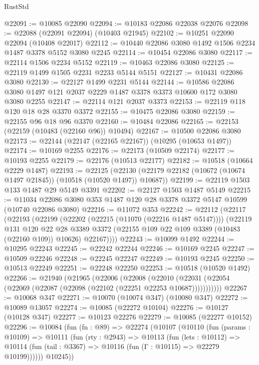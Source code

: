 \begin{lexlean}{RustStd}
\begin{coremodule}
@22091 := @10085 @22090
@22094 := @10183 @22086 @22038 @22076
@22098 := @22088 (@22091 @22094) (@10403 @21945)
@22102 := @10251 @22090 @22094 (@10408 @22017)
@22112 := @10440 @22086 @3080 @1492 @1506 @2234 @1487 @3378 @5152 @3080 @2245
@22114 := @10454 @22086 @3080
@22117 := @22114 @1506 @2234 @5152
@22119 := @10463 @22086 @3080
@22125 := @22119 @1499 @1505 @2231 @2233 @5144 @5151
@22127 := @10431 @22086 @3080
@22130 := @22127 @1499 @2231 @5144
@22144 := @10586 @22086 @3080 @1497 @121 @2037 @2229 @1487 @3378 @3373 @10600 @172 @3080 @3080 @2255
@22147 := @22114 @121 @2037 @3373
@22153 := @22119 @118 @120 @18 @28 @3370 @3372
@22155 := @10475 @22086 @3080
@22159 := @22155 @96 @18 @96 @3370
@22160 := @10484 @22086
@22165 := @22153 (@22159 (@10483 (@22160 @96)) @10494)
@22167 := @10500 @22086 @3080
@22173 := @22144 (@22147 (@22165 @22167)) (@10295 (@10653 @1497))
@22174 := @10169 @2255
@22176 := @22173 (@10509 @22174)
@22177 := @10193 @2255
@22179 := @22176 (@10513 @22177)
@22182 := @10518 (@10664 @2229 @1487)
@22193 := @22125
    (@22130 (@22179 @22182 (@10672 (@10674 @1497 @21845)) (@10518 (@10520 @1497)) @10687))
@22199 := @22119 @1503 @133 @1487 @29 @5149 @3391
@22202 := @22127 @1503 @1487 @5149
@22215 := @11034 @22086 @3080 @353 @1487 @120 @28 @3378 @3372 @5147 @10599 (@10740 @22086 @3080)
@22216 := @11072 @353
@22242 := @22112
    (@22117
      (@22193
        (@22199
          (@22202 (@22215 (@11070 (@22216 @1487 @5147))))
          (@22119
            @131
            @120
            @22
            @28
            @3389
            @3372
            (@22155 @109 @22 @109 @3389 (@10483 (@22160 @109)) @10626)
            @22167))))
@22243 := @10099 @1492
@22244 := @10295 @22243
@22245 := @22242 @22244
@22246 := @10169 @2245
@22247 := @10509 @22246
@22248 := @22245 @22247
@22249 := @10193 @2245
@22250 := @10513 @22249
@22251 := @22248 @22250
@22253 := @10518 (@10520 @1492)
@22266 := @21940
    (@21965
      (@22006
        (@22008
          (@22010 (@22031 (@22054 (@22069 (@22087 (@22098 (@22102 (@22251 @22253 @10687)))))))))))
@22267 := @10068 @347
@22271 := @10070 (@10074 @347) (@10080 @347)
@22272 := @10089 @13057
@22274 := @10085 (@22272 @10104)
@22276 := @10127 (@10128 @347)
@22277 := @10123 @22276
@22279 := @10085 (@22277 @10152)
@22296 := @10084
    (fun (fn : @89) =>
    @22274
      (@10107
        (@10110
          (fun (params : @10109) =>
          @10111
            (fun (rty : @2943) =>
            @10113
              (fun (lets : @10112) =>
              @10114 (fun (tail : @3367) => @10116 (fun (Γ : @10115) => @22279 @10199))))))
        @10245))

\end{coremodule}
\end{lexlean}
